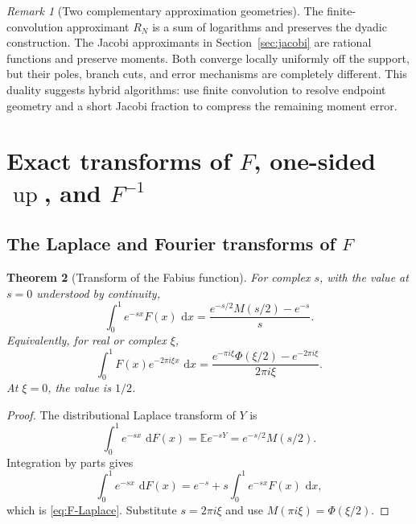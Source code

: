 \documentclass[11pt]{article}
\newtheorem{theorem}{Theorem}[section]
\theoremstyle{definition}
\theoremstyle{remark}
\newtheorem{remark}[theorem]{Remark}
\newcommand{\E}{\mathbb E}
\newcommand{\dd}{\,\mathrm d}
\newcommand{\Up}{\operatorname{up}}
\begin{document}
\begin{remark}[Two complementary approximation geometries]
The finite-convolution approximant \(R_N\) is a sum of logarithms and preserves the dyadic
construction.  The Jacobi approximants in Section~\ref{sec:jacobi} are rational functions
and preserve moments.  Both converge locally uniformly off the support, but their poles,
branch cuts, and error mechanisms are completely different.  This duality suggests hybrid
algorithms: use finite convolution to resolve endpoint geometry and a short Jacobi fraction
to compress the remaining moment error.
\end{remark}

\section{Exact transforms of \(F\), one-sided \(\Up\), and \(F^{-1}\)}\label{sec:fabius-transforms}

\subsection{The Laplace and Fourier transforms of \(F\)}

\begin{theorem}[Transform of the Fabius function]\label{thm:F-transform}
For complex \(s\), with the value at \(s=0\) understood by continuity,
\begin{equation}
 \boxed{
 \int_0^1 e^{-sx}F(x)\,\dd x
 =\frac{e^{-s/2}M(s/2)-e^{-s}}{s}.
 }                                                           \label{eq:F-Laplace}
\end{equation}
Equivalently, for real or complex \(\xi\),
\begin{equation}
 \boxed{
 \int_0^1F(x)e^{-2\pi i\xi x}\,\dd x
 =\frac{e^{-\pi i\xi}\Phi(\xi/2)-e^{-2\pi i\xi}}{2\pi i\xi}.
 }                                                           \label{eq:F-Fourier}
\end{equation}
At \(\xi=0\), the value is \(1/2\).
\end{theorem}

\begin{proof}
The distributional Laplace transform of \(Y\) is
\begin{equation}
 \int_0^1 e^{-sx}\,\dd F(x)=\E e^{-sY}=e^{-s/2}M(s/2).       \label{eq:dF-Laplace}
\end{equation}
Integration by parts gives
\[
 \int_0^1e^{-sx}\,\dd F(x)
 =e^{-s}+s\int_0^1e^{-sx}F(x)\,\dd x,
\]
which is \eqref{eq:F-Laplace}.  Substitute \(s=2\pi i\xi\) and use
\(M(\pi i\xi)=\Phi(\xi/2)\).
\end{proof}
\end{document}
